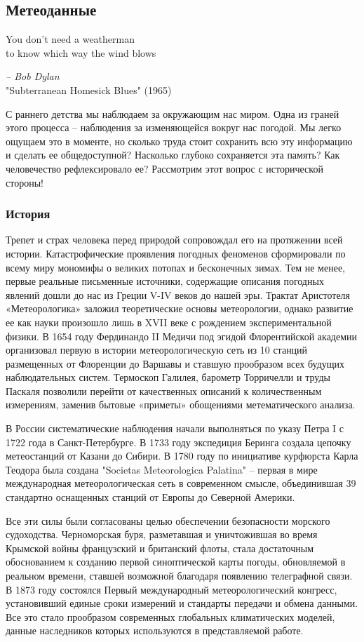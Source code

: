 
\subsection{Метеоданные}

\epigraph{
    You don't need a weatherman \\
    to know which way the wind blows
}{\textit{-- Bob Dylan}\\"Subterranean Homesick Blues" (1965)}


С раннего детства мы наблюдаем за окружающим нас миром.
Одна из граней этого процесса -- наблюдения за изменяющейся вокруг нас погодой.
Мы легко ощущаем это в моменте, но сколько труда стоит сохранить всю эту информацию и сделать ее общедоступной?
Насколько глубоко сохраняется эта память?
Как человечество рефлексировало ее?
Рассмотрим этот вопрос с исторической стороны!

\subsubsection{История}

Трепет и страх человека перед природой сопровождал его на протяжении всей истории.
Катастрофические проявления погодных феноменов сформировали по всему миру мономифы о великих потопах и бесконечных зимах.
Тем не менее, первые реальные письменные источники, содержащие описания погодных явлений дошли до нас из Греции V-IV веков до нашей эры.
Трактат Аристотеля «Метеорологика» заложил теоретические основы метеорологии, однако развитие ее как науки произошло лишь в XVII веке с рождением экспериментальной физики.
В 1654 году Фердинандо II Медичи под эгидой Флорентийской академии организовал первую в истории метеорологическую сеть из 10 станций размещенных от Флоренции до Варшавы и ставшую прообразом всех будущих наблюдательных систем.
Термоскоп Галилея, барометр Торричелли и труды Паскаля позволили перейти от качественных описаний к количественным измерениям, заменив бытовые «приметы» обощениями метематического анализа.

В России систематические наблюдения начали выполняться по указу Петра I с 1722 года в Санкт-Петербурге. 
В 1733 году экспедиция Беринга создала цепочку метеостанций от Казани до Сибири. 
В 1780 году по инициативе курфюрста Карла Теодора была создана "Societas Meteorologica Palatina" -- первая в мире международная метеорологическая сеть в современном смысле, объединившая 39 стандартно оснащенных станций от Европы до Северной Америки.

Все эти силы были согласованы целью обеспечении безопасности морского судоходства.
Черноморская буря, разметавшая и уничтожившая во время Крымской войны французский и британский флоты, стала достаточным обоснованием к созданию первой синоптической карты погоды, обновляемой в реальном времени, ставшей возможной благодаря появлению телеграфной связи.
В 1873 году состоялся Первый международный метеорологический конгресс, установивший единые сроки измерений и стандарты передачи и обмена данными.
Все это стало прообразом современных глобальных климатических моделей, данные наследников которых используются в представляемой работе.

